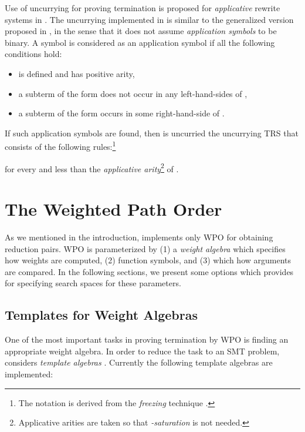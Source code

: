 \documentclass{llncs}
\begin{document}
	Use of uncurrying for proving termination is proposed for
	\emph{applicative} rewrite systems in \cite{HMZ13}.
	The uncurrying implemented in \NaTT is similar to the
	generalized version proposed in \cite{ST11},
	in the sense that it does not assume \emph{application symbols} to be binary.
	A symbol  is considered as an application symbol if all the following
	conditions hold:
	\begin{itemize}
	\item  is defined and has positive arity,
	\item
		a subterm of the form  does not occur
		in any left-hand-sides of ,
	\item
		a subterm of the form  occurs
		in some right-hand-side of .
	\end{itemize}
	If such application symbols are found, then  is uncurried \wrt
	the uncurrying TRS  that consists of the following rules:\footnote{The notation is derived from the \emph{freezing} technique \cite{X98}.
}
	
	for every  and  less than the \emph{applicative arity}\footnote{Applicative arities are taken 
	so that \emph{-saturation} is not needed.
} of .


\section{The Weighted Path Order}
\label{sec:reduction}

As we mentioned in the introduction, \NaTT
implements only WPO for obtaining reduction pairs.
WPO is parameterized by
(1) a \emph{weight algebra} which specifies how weights are computed,
(2)  function symbols, and
(3)  which
 how arguments are compared.
In the following sections, we present some options which
\NaTT provides for specifying search spaces for these parameters.

\subsection{Templates for Weight Algebras}

One of the most important tasks
in proving termination by WPO is finding an appropriate weight algebra.
In order to reduce the task to an SMT problem,
\NaTT considers \emph{template algebras}
.
Currently the following template algebras are implemented:
\end{document}
